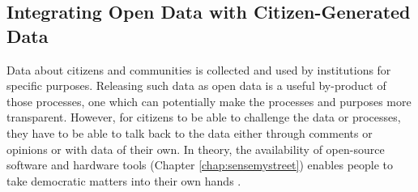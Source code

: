 \subsection{Integrating Open Data with Citizen-Generated Data}
Data about citizens and communities is collected and used by institutions for specific purposes. Releasing such data as open data is a useful by-product of those processes, one which can potentially make the processes and purposes more transparent. However, for citizens to be able to challenge the data or processes, they have to be able to talk back to the data either through comments or opinions or with data of their own. In theory, the availability of open-source software and hardware tools (Chapter \ref{chap:sensemystreet}) enables people to take democratic matters into their own hands \citep{balestrini_iot_2015,balestrini_city_2017,asad_creating_2017}.


